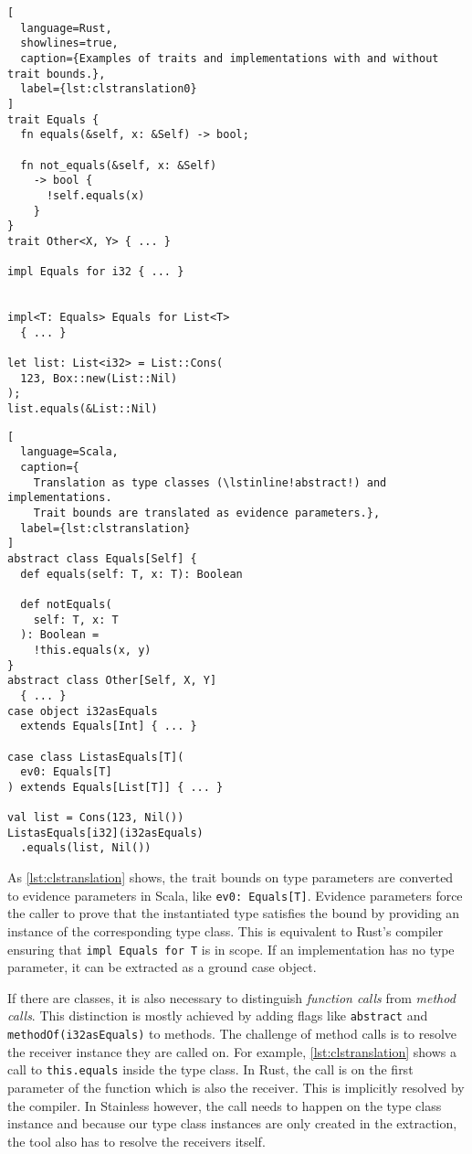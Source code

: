 \noindent\begin{minipage}[t]{.49\textwidth}
\begin{lstlisting}[
  language=Rust,
  showlines=true,
  caption={Examples of traits and implementations with and without trait bounds.},
  label={lst:clstranslation0}
]
trait Equals {
  fn equals(&self, x: &Self) -> bool;

  fn not_equals(&self, x: &Self)
    -> bool {
      !self.equals(x)
    }
}
trait Other<X, Y> { ... }

impl Equals for i32 { ... }


impl<T: Equals> Equals for List<T>
  { ... }

let list: List<i32> = List::Cons(
  123, Box::new(List::Nil)
);
list.equals(&List::Nil)
\end{lstlisting}
\end{minipage}\hfill
\begin{minipage}[t]{.49\textwidth}
\begin{lstlisting}[
  language=Scala,
  caption={
    Translation as type classes (\lstinline!abstract!) and implementations.
    Trait bounds are translated as evidence parameters.},
  label={lst:clstranslation}
]
abstract class Equals[Self] {
  def equals(self: T, x: T): Boolean

  def notEquals(
    self: T, x: T
  ): Boolean =
    !this.equals(x, y)
}
abstract class Other[Self, X, Y]
  { ... }
case object i32asEquals
  extends Equals[Int] { ... }

case class ListasEquals[T](
  ev0: Equals[T]
) extends Equals[List[T]] { ... }

val list = Cons(123, Nil())
ListasEquals[i32](i32asEquals)
  .equals(list, Nil())
\end{lstlisting}
\end{minipage}

As \autoref{lst:clstranslation} shows, the trait bounds on type parameters are
converted to evidence parameters in Scala, like \passthrough{\lstinline!ev0:
Equals[T]!}. Evidence parameters force the caller to prove that the instantiated
type satisfies the bound by providing an instance of the corresponding type
class. This is equivalent to Rust's compiler ensuring that
\passthrough{\lstinline!impl Equals for T!} is in scope. If an implementation
has no type parameter, it can be extracted as a ground case object.

If there are classes, it is also necessary to distinguish \emph{function calls}
from \emph{method calls}. This distinction is mostly achieved by adding flags
like \passthrough{\lstinline!abstract!} and
\passthrough{\lstinline!methodOf(i32asEquals)!} to methods. The challenge of
method calls is to resolve the receiver instance they are called on. For
example, \autoref{lst:clstranslation} shows a call to \lstinline!this.equals!
inside the type class. In Rust, the call is on the first parameter of the
function which is also the receiver. This is implicitly resolved by the
compiler. In Stainless however, the call needs to happen on the type class
instance and because our type class instances are only created in the
extraction, the tool also has to resolve the receivers itself.

